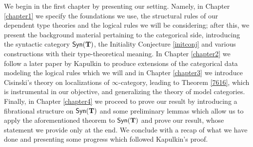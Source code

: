 \begin{organization}
  We begin in the first chapter by presenting our setting. Namely, in
  Chapter \ref{chapter1} we specify the foundations we use, the structural rules of our
  dependent type theories and the logical rules we will be considering; after
  this, we present the background material pertaining to the categorical side,
  introducing the syntactic category $\mathsf{Syn}(\mathbf{T})$, the Initiality Conjecture
  \ref{initconj} and various constructions
  with their type-theoretical meaning. In Chapter \ref{chapter2} we follow
  a later paper by Kapulkin \cite{Kap17} to produce
  extensions of the categorical data modeling the logical rules which we will
  and in Chapter
  \ref{chapter3} we introduce Cisinski's theory on localizations of
  $\infty$-category, leading to Theorem \ref{7616}, which is instrumental in our
  objective, and generalizing the theory of model categories. Finally, in
  Chapter \ref{chapter4} we proceed to prove our result by introducing a
  fibrational structure on $\mathsf{Syn}(\mathbf{T})$ and some preliminary lemmas which allow us
  to apply the aforementioned theorem to $\mathsf{Syn}(\mathbf{T})$ and prove our result,
  whose statement we provide only at the end. We conclude with a
  recap of what we have done and presenting some progress which followed
  Kapulkin's proof.
\end{organization}
